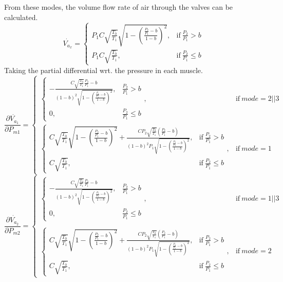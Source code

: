 \documentclass[11pt,a4paper]{article}
\begin{document}
\begin{appendices}
From these modes, the volume flow rate of air through the valves can be calculated.\newline
\begin{equation}
\dot{V_{a_x}} =\begin{cases} 
    P_1 C \sqrt{\frac{T_0}{T_1}} \sqrt{1 - (\frac{\frac{P_2}{P_1} - b}{1-b})^2}, & \text{if}\ \frac{P_2}{P_1} > b\\ 
    P_1 C \sqrt{\frac{T_0}{T_1}}, & \text{if}\ \frac{P_2}{P_1} \leq b
    \end{cases} 
\end{equation}
Taking the partial differential wrt. the pressure in each muscle.\newline
\begin{equation}
\frac{\partial \dot{V_{a_1}}}{\partial P_{m1}} =
    \begin{cases} 
    \begin{cases}
        -\frac{C \sqrt{\frac{T_0}{T_1}} \frac{P_2}{P_1} - b}{(1-b)^2 \sqrt{1 - \left(\frac{\frac{P_2}{P_1} - b}{1-b}\right)^2}}, & \frac{P_2}{P_1} > b\\ 
        0, & \frac{P_2}{P_1} \leq b
            \end{cases}, & \text{if}\ mode = 2 || 3\\
        \begin{cases}
        C \sqrt{\frac{T_0}{T_1}} \sqrt{1 - \left(\frac{\frac{P_2}{P_1} - b}{1-b}\right)^2} + \frac{C P_2\sqrt{\frac{T_0}{T_1}} \left(\frac{P_2}{P_1} - b\right)}{(1-b)^2 P_1 \sqrt{1 - \left(\frac{\frac{P_2}{P_1} - b}{1-b}\right)^2}}, & \text{if}\ \frac{P_2}{P_1} > b\\ 
        C \sqrt{\frac{T_0}{T_1}}, & \text{if}\ \frac{P_2}{P_1} \leq b
            \end{cases}, & \text{if}\ mode = 1
    \end{cases} 
\end{equation}
\begin{equation}
\frac{\partial \dot{V_{a_2}}}{\partial P_{m2}} =
    \begin{cases} 
    \begin{cases}
        -\frac{C \sqrt{\frac{T_0}{T_1}} \frac{P_2}{P_1} - b}{(1-b)^2 \sqrt{1 - \left(\frac{\frac{P_2}{P_1} - b}{1-b}\right)^2}}, & \frac{P_2}{P_1} > b\\ 
        0, & \frac{P_2}{P_1} \leq b
            \end{cases}, & \text{if}\ mode = 1 || 3\\\\
        \begin{cases}
        C \sqrt{\frac{T_0}{T_1}} \sqrt{1 - \left(\frac{\frac{P_2}{P_1} - b}{1-b}\right)^2} + \frac{C P_2\sqrt{\frac{T_0}{T_1}} \left(\frac{P_2}{P_1} - b\right)}{(1-b)^2 P_1 \sqrt{1 - \left(\frac{\frac{P_2}{P_1} - b}{1-b}\right)^2}}, & \text{if}\ \frac{P_2}{P_1} > b\\ 
        C \sqrt{\frac{T_0}{T_1}}, & \text{if}\ \frac{P_2}{P_1} \leq b
            \end{cases}, & \text{if}\ mode = 2
    \end{cases} 
\end{equation}


\end{appendices}
\end{document}
